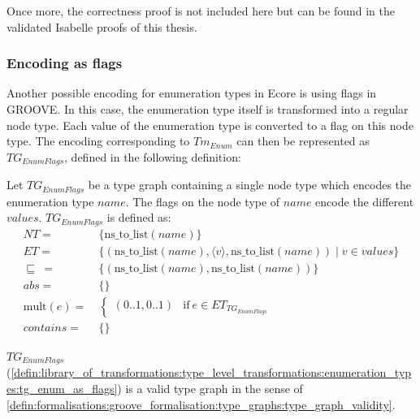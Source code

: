 Once more, the correctness proof is not included here but can be found in the validated Isabelle proofs of this thesis.

\subsubsection{Encoding as flags}

Another possible encoding for enumeration types in Ecore is using flags in GROOVE. In this case, the enumeration type itself is transformed into a regular node type. Each value of the enumeration type is converted to a flag on this node type. The encoding corresponding to $Tm_{Enum}$ can then be represented as $TG_{EnumFlags}$, defined in the following definition:

\begin{defin}
\label{defin:library_of_transformations:type_level_transformations:enumeration_types:tg_enum_as_flags}
Let $TG_{EnumFlags}$ be a type graph containing a single node type which encodes the enumeration type $name$. The flags on the node type of $name$ encode the different $values$. $TG_{EnumFlags}$ is defined as:
\begin{align*}
NT =\ &\{\mathrm{ns\_\!to\_\!list}(name)\} \\
ET =\ &\{ (\mathrm{ns\_\!to\_\!list}(name), \langle v \rangle, \mathrm{ns\_\!to\_\!list}(name)) \mid v \in values \}\\
\!\!\sqsubseteq\ =\ &\{(\mathrm{ns\_\!to\_\!list}(name), \mathrm{ns\_\!to\_\!list}(name))\} \\
abs =\ &\{\} \\
\mathrm{mult}(e) =\ &\begin{cases}
    (0..1, 0..1) &\mathrm{if}\ e \in ET_{TG_{EnumFlags}}
\end{cases}\\
contains =\ &\{\}
\end{align*}
\end{defin}

\begin{thm}
\label{defin:library_of_transformations:type_level_transformations:enumeration_types:tg_enum_as_flags_correct}
$TG_{EnumFlags}$ (\cref{defin:library_of_transformations:type_level_transformations:enumeration_types:tg_enum_as_flags}) is a valid type graph in the sense of \cref{defin:formalisations:groove_formalisation:type_graphs:type_graph_validity}.
\end{thm}


